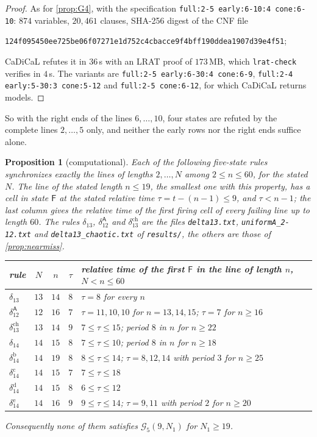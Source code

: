 \documentclass[11pt]{article}
\newtheorem{proposition}[theorem]{Proposition}
\theoremstyle{definition}
\theoremstyle{remark}
\newcommand{\Aq}{\mathsf A}
\newcommand{\Fq}{\mathsf F}
\begin{document}
\begin{proof}
As for \cref{prop:G4}, with the specification \texttt{full:2-5 early:6-10:4
cone:6-10}: $874$ variables, $20{,}461$ clauses, SHA-256 digest of the CNF
file
\begin{center}\small
\texttt{124f095450ee725be06f07271e1d752c4cbacce9f4bff190ddea1907d39e4f51};
\end{center}
CaDiCaL refutes it in $36$\,s with an LRAT proof of $173$\,MB, which
\texttt{lrat-check} verifies in $4$\,s. The variants are \texttt{full:2-5
early:6-30:4 cone:6-9}, \texttt{full:2-4 early:5-30:3 cone:5-12} and
\texttt{full:2-5 cone:6-12}, for which CaDiCaL returns models.
\end{proof}

So with the right ends of the lines $6,\dots,10$, four states are refuted by
the complete lines $2,\dots,5$ only, and neither the early rows nor the right
ends suffice alone.

\begin{proposition}[computational]\label{prop:nearmissearly}
Each of the following five-state rules synchronizes exactly the lines of
lengths $2,\dots,N$ among $2\le n\le60$, for the stated $N$. The line of the
stated length $n\le19$, the smallest one with this property, has a cell in
state $\Fq$ at the stated relative time $\tau=t-(n-1)\le9$, and $\tau<n-1$; the
last column gives the relative time of the first firing cell of every failing
line up to length $60$. The rules $\delta_{13}$, $\delta_{12}^{\Aq}$ and
$\delta_{13}^{\mathrm{ch}}$ are the files \texttt{delta13.txt},
\texttt{uniformA\_2-12.txt} and \texttt{delta13\_chaotic.txt} of
\texttt{results/}, the others are those of \cref{prop:nearmiss}.
\begin{center}\footnotesize
\begin{tabular}{@{}lccc>{\raggedright\arraybackslash}p{6.3cm}@{}}
\toprule
rule & $N$ & $n$ & $\tau$ & relative time of the first $\Fq$ in the line of length $n$, $N<n\le60$\\
\midrule
$\delta_{13}$ & $13$ & $14$ & $8$ & $\tau=8$ for every $n$\\
$\delta_{12}^{\Aq}$ & $12$ & $16$ & $7$ & $\tau=11,10,10$ for $n=13,14,15$; $\tau=7$ for $n\ge16$\\
$\delta_{13}^{\mathrm{ch}}$ & $13$ & $14$ & $9$ & $7\le\tau\le15$; period $8$ in $n$ for $n\ge22$\\
$\delta_{14}$ & $14$ & $15$ & $8$ & $7\le\tau\le10$; period $8$ in $n$ for $n\ge18$\\
$\delta_{14}^{\mathrm b}$ & $14$ & $19$ & $8$ & $8\le\tau\le14$; $\tau=8,12,14$ with period $3$ for $n\ge25$\\
$\delta_{14}^{\mathrm c}$ & $14$ & $15$ & $7$ & $7\le\tau\le18$\\
$\delta_{14}^{\mathrm d}$ & $14$ & $15$ & $8$ & $6\le\tau\le12$\\
$\delta_{14}^{\mathrm e}$ & $14$ & $16$ & $9$ & $9\le\tau\le14$; $\tau=9,11$ with period $2$ for $n\ge20$\\
\bottomrule
\end{tabular}
\end{center}
Consequently none of them satisfies $\mathcal G_5(9,N_1)$ for $N_1\ge19$.
\end{proposition}
\end{document}
